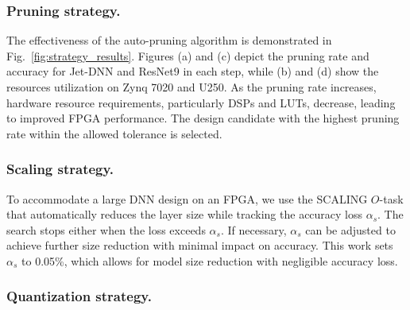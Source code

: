 \subsubsection{Pruning strategy.} 


The effectiveness of the auto-pruning algorithm is demonstrated in Fig.~\ref{fig:strategy_results}. Figures (a) and (c) depict the pruning rate and accuracy for Jet-DNN and ResNet9 in each step, while (b) and (d) show the resources utilization on Zynq 7020 and U250. As the pruning rate increases, hardware resource requirements, particularly DSPs and LUTs, decrease, leading to improved FPGA performance. The design candidate with the highest pruning rate within the allowed tolerance is selected.

\subsubsection{Scaling strategy.} 
To accommodate a large DNN design on an FPGA, we use the SCALING $O$-task that automatically reduces the layer size while tracking the accuracy loss $\alpha_s$. The search stops either when the loss exceeds $\alpha_s$.  
If necessary, $\alpha_s$ can be adjusted to achieve further size reduction with minimal impact on accuracy. This work sets $\alpha_s$ to 0.05\%, which allows for model size reduction with negligible accuracy loss.


\subsubsection{Quantization strategy.} 

